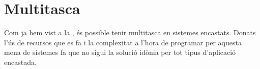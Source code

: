\section{Multitasca}
\label{sec:multitasca}
Com ja hem vist a la , és possible tenir multitasca en sistemes encastats. Donats l'ús de recursos que es fa i la complexitat a l'hora de programar per aquesta mena de sistemes fa que no sigui la solució idònia per tot tipus d'aplicació encastada.


